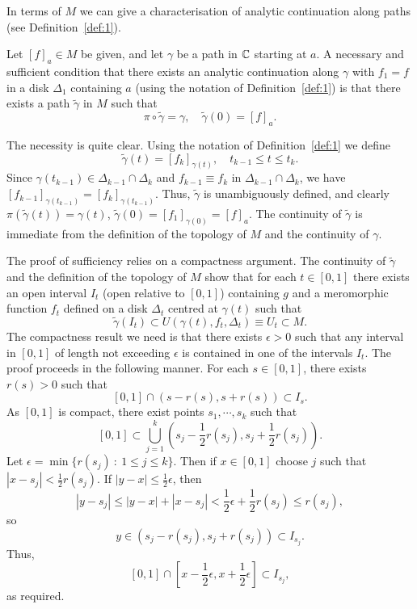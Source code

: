 \documentclass[a4paper,11pt]{article}
\begin{document}
In terms of $M$ we can give a characterisation of analytic
continuation along paths (see Definition~\ref{def:1}).

\begin{propn}
  \label{propn:1}
  Let $[f]_a \in M$ be given, and let $\gamma$ be a path in ${\mathbb C}$
  starting at $a$.  A necessary and sufficient condition that there
  exists an analytic continuation along $\gamma$ with $f_1 = f$ in a
  disk $\Delta_1$ containing $a$ (using the notation of
  Definition~\ref{def:1}) is that there exists a path
  $\widetilde{\gamma}$ in $M$ such that
  $$
  \pi \circ \widetilde{\gamma} = \gamma,\quad
  \widetilde{\gamma}(0) = [f]_a.
  $$
\end{propn}
\begin{myproof}
  The necessity is quite clear.  Using the notation of
  Definition~\ref{def:1} we define
  $$
  \widetilde{\gamma}(t) = [f_k]_{\gamma(t)},\quad t_{k-1} \le t \le t_k.
  $$
  Since $\gamma(t_{k-1}) \in \Delta_{k-1} \cap \Delta_k$ and $f_{k-1}
  \equiv f_k$ in $\Delta_{k-1} \cap \Delta_k$, we have
  $[f_{k-1}]_{\gamma(t_{k-1})} = [f_{k}]_{\gamma(t_{k-1})}$.  Thus,
  $\widetilde{\gamma}$ is unambiguously defined, and clearly
  $\pi(\widetilde{\gamma}(t)) = \gamma(t)$, $\widetilde{\gamma}(0) =
  [f_1]_{\gamma(0)} = [f]_a$.  The continuity of $\widetilde{\gamma}$
  is immediate from the definition of the topology of $M$ and the
  continuity of $\gamma$.

  The proof of sufficiency relies on a compactness argument.  The
  continuity of $\widetilde{\gamma}$ and the definition of the
  topology of $M$ show that for each $t \in [0,1]$ there exists an
  open interval $I_t$ (open relative to $[0,1]$) containing $g$ and a
  meromorphic function $f_t$ defined on a disk $\Delta_t$ centred at
  $\gamma(t)$ such that
  $$
  \widetilde{\gamma}(I_t) \subset U(\gamma(t), f_t, \Delta_t) 
  \equiv U_t \subset M.
  $$
  The compactness result we need is that there exists $\epsilon > 0$
  such that any interval in $[0,1]$ of length not exceeding $\epsilon$
  is contained in one of the intervals $I_t$.  The proof proceeds in
  the following manner.  For each $s \in [0,1]$, there exists $r(s) >
  0$ such that
  $$
  [0,1] \cap (s-r(s), s + r(s)) \subset I_s.
  $$
  As $[0,1]$ is compact, there exist points $s_1, \cdots, s_k$ such
  that 
  $$
  [0,1] \subset \bigcup_{j=1}^k (s_j - \frac{1}{2}r(s_j), s_j +
  \frac{1}{2}r(s_j)).
  $$
  Let $\epsilon = \min\{r(s_j) ~:~ 1\le j\le k\}$.  Then if $x \in
  [0,1]$ choose $j$ such that $|x-s_j| < \frac{1}{2}r(s_j)$.  If
  $|y-x| \le \frac{1}{2}\epsilon$, then
  $$
  |y - s_j| \le |y-x| + |x-s_j| 
  < \frac{1}{2}\epsilon + \frac{1}{2}r(s_j) \le r(s_j),
  $$
  so
  $$
  y \in (s_j - r(s_j), s_j + r(s_j)) \subset I_{s_j}.
  $$
  Thus,
  $$
  [0,1] \cap [x-\frac{1}{2}\epsilon, x+\frac{1}{2}\epsilon]
  \subset I_{s_j},
  $$
  as required.


\end{myproof}
\end{document}
